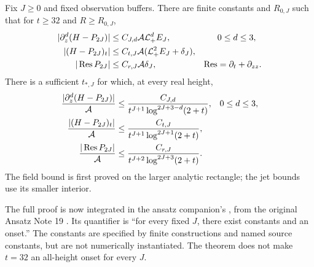 \begin{theorem}
\label{thm:positive-fixed}
Fix $J\ge0$ and fixed observation buffers. There are finite constants
and $R_{0,J}$ such that for $t\ge32$ and $R\ge R_{0,J}$,
\begin{align}
 |\partial_z^d(H-P_{2J})|&\le C_{J,d}\mathcal A\mathcal L_+^dE_J,
                         &&0\le d\le3,\\
 |(H-P_{2J})_t|&\le C_{t,J}\mathcal A(\mathcal L_+^2E_J+\delta_J),\\
 |\operatorname{Res} P_{2J}|&\le C_{r,J}\mathcal A\delta_J,
 &\operatorname{Res}&=\partial_t+\partial_{zz}.
 \label{eq:positive-full-error}
\end{align}
There is a sufficient $t_{*,J}$ for which, at every real height,
\begin{align}
 \frac{|\partial_z^d(H-P_{2J})|}{\mathcal A}
  &\le\frac{C_{J,d}}{t^{J+1}\log^{2J+3-d}(2+t)},&&0\le d\le3,\\
 \frac{|(H-P_{2J})_t|}{\mathcal A}
  &\le\frac{C_{t,J}}{t^{J+1}\log^{2J+1}(2+t)},\\
 \frac{|\operatorname{Res} P_{2J}|}{\mathcal A}
  &\le\frac{C_{r,J}}{t^{J+2}\log^{2J+3}(2+t)}.
 \label{eq:positive-eventual}
\end{align}
The field bound is first proved on the larger analytic rectangle;
the jet bounds use its smaller interior.
\end{theorem}
The full proof is now integrated in the ansatz companion's
,
from the original Ansatz Note 19 \cite{positive}. Its
quantifier is ``for every fixed $J$, there exist constants and an
onset.'' The constants are specified by finite constructions and named
source constants, but are not numerically instantiated. The theorem
does not make $t=32$ an all-height onset for every $J$.

